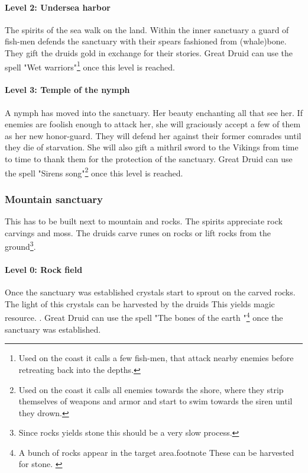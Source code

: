 \documentclass[a4paper]{article}
\begin{document}
			\paragraph{Level 2: Undersea harbor}
				The spirits of the sea walk on the land.
				Within the inner sanctuary a guard of fish-men defends the sanctuary
				with their spears fashioned from (whale)bone.
				They gift the druids gold in exchange for their stories.
				Great Druid can use the spell "Wet warriors"\footnote{
					Used on the coast it calls a few fish-men,
					that attack nearby enemies before retreating back into the depths.
				} once this level is reached.

			\paragraph{Level 3: Temple of the nymph}
				A nymph has moved into the sanctuary.
				Her beauty enchanting all that see her.
				If enemies are foolish enough to attack her,
				she will graciously accept a few of them as her new honor-guard.
				They will defend her against their former comrades until they die of
				starvation.
				She will also gift a mithril sword to the \gls{Vikings} from time to time
				to thank them for the protection of the sanctuary.
				Great Druid can use the spell "Sirens song"\footnote{
					Used on the coast it calls all enemies towards the shore,
					where they strip themselves of weapons and armor
					and start to swim towards the siren until they drown.
				} once this level is reached.

		\subsubsection{Mountain sanctuary}
			This has to be built next to mountain and rocks.
			The spirits appreciate rock carvings and moss.
			The druids carve runes on rocks or lift rocks from the ground\footnote{
				Since rocks yields stone this should be a very slow process.
			}.

			\paragraph{Level 0: Rock field}
				Once the sanctuary was established crystals start to sprout on the carved rocks.
				The light of this crystals can be harvested by the druids{
					This yields magic resource.
				}.
				Great Druid can use the spell "The bones of the earth "\footnote{
					A bunch of rocks appear in the target area.footnote{
						These can be harvested for stone.
					}
				} once the sanctuary was established.
\end{document}

